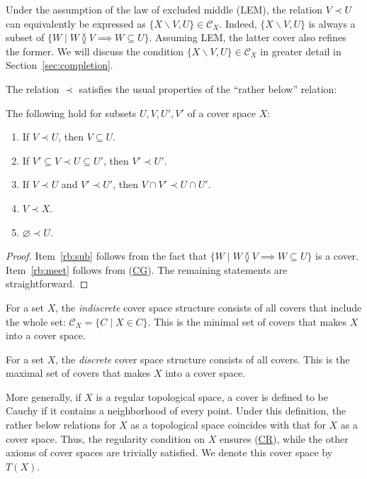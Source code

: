 \documentclass[reqno]{amsart}
\newcommand{\axref}[1]{(\hyperref[ax:#1]{#1})}
\theoremstyle{definition}
\theoremstyle{remark}
\numberwithin{figure}{section}
\newcommand{\overlap}[2]{#1 \between #2}
\newcommand{\rb}{\prec}
\begin{document}
\begin{remark}
Under the assumption of the law of excluded middle (LEM), the relation $V \rb U$ can equivalently be expressed as $\{ X \backslash V, U \} \in \mathcal{C}_X$.
Indeed, $\{ X \backslash V, U \}$ is always a subset of $\{ W \mid \overlap{W}{V} \implies W \subseteq U \}$.
Assuming LEM, the latter cover also refines the former.
We will discuss the condition $\{ X \backslash V, U \} \in \mathcal{C}_X$ in greater detail in Section~\ref{sec:completion}.
\end{remark}

The relation $\rb$ satisfies the usual properties of the ``rather below'' relation:

\begin{prop}[rb-props]
The following hold for subsets $U,V,U',V'$ of a cover space $X$:
\begin{enumerate}
\item \label{rb:sub} If $V \rb U$, then $V \subseteq U$.
\item If $V' \subseteq V \rb U \subseteq U'$, then $V' \rb U'$.
\item \label{rb:meet} If $V \rb U$ and $V' \rb U'$, then $V \cap V' \rb U \cap U'$.
\item $V \rb X$.
\item $\varnothing \rb U$.
\end{enumerate}
\end{prop}
\begin{proof}
Item~\eqref{rb:sub} follows from the fact that $\{ W \mid \overlap{W}{V} \implies W \subseteq U \}$ is a cover.
Item~\eqref{rb:meet} follows from \axref{CG}.
The remaining statements are straightforward.
\end{proof}

\begin{example}
For a set $X$, the \emph{indiscrete} cover space structure consists of all covers that include the whole set: $\mathcal{C}_X = \{ C \mid X \in C \}$.
This is the minimal set of covers that makes $X$ into a cover space.
\end{example}

\begin{example}
For a set $X$, the \emph{discrete} cover space structure consists of all covers.
This is the maximal set of covers that makes $X$ into a cover space.
\end{example}

\begin{example}
More generally, if $X$ is a regular topological space, a cover is defined to be Cauchy if it contains a neighborhood of every point.
Under this definition, the rather below relations for $X$ as a topological space coincides with that for $X$ as a cover space.
Thus, the regularity condition on $X$ ensures \axref{CR}, while the other axioms of cover spaces are trivially satisfied.
We denote this cover space by $T(X)$.
\end{example}
\end{document}
